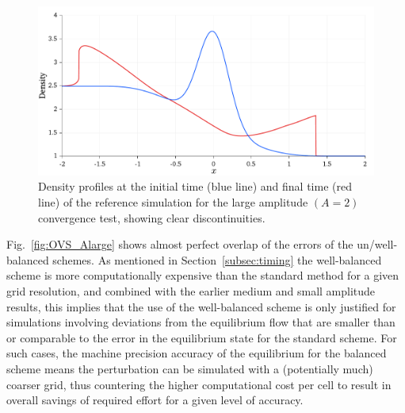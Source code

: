 \begin {figure}
\centering
\includegraphics[width=13cm]{figures/OVSeps2profile}
\caption {Density profiles at the initial time (blue line) and final time (red line) of the reference simulation for the large amplitude $(A=2)$ convergence test, showing clear discontinuities.}
\label{fig:OVS_Alarge_profile}
\end{figure}

Fig.~\ref{fig:OVS_Alarge} shows almost perfect overlap of the errors of the un/well-balanced schemes. As mentioned in Section~\ref{subsec:timing} the well-balanced scheme is more computationally expensive than the standard method for a given grid resolution, and combined with the earlier medium and small amplitude results, this implies that the use of the well-balanced scheme is only justified for simulations involving deviations from the equilibrium flow that are smaller than or comparable to the error in the equilibrium state for the standard scheme. For such cases, the machine precision accuracy of the equilibrium for the balanced scheme means the perturbation can be simulated with a (potentially much) coarser grid, thus countering the higher computational cost per cell to result in overall savings of required effort for a given level of accuracy.

